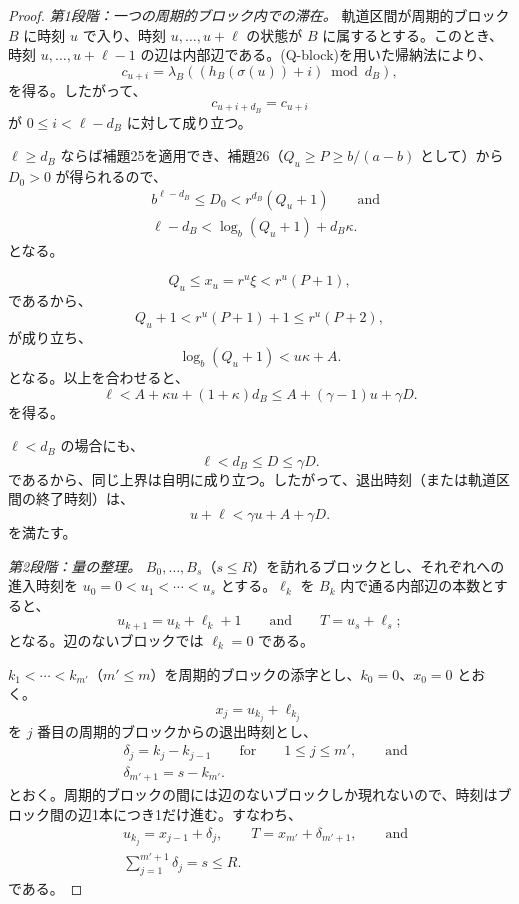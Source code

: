 \documentclass[11pt,reqno]{amsart}
\theoremstyle{definition}
\theoremstyle{definition}
\theoremstyle{remark}
\begin{document}
\begin{proof}\leavevmode\label{proof:27}
\emph{第1段階：一つの周期的ブロック内での滞在。} 軌道区間が周期的ブロック \(B\) に時刻 \(u\) で入り、時刻 \(u,\ldots,u+\ell\) の状態が \(B\) に属するとする。このとき、時刻 \(u,\ldots,u+\ell-1\) の辺は内部辺である。(Q-block)を用いた帰納法により、
\[
c_{u+i}=\lambda_B((h_B(\sigma(u))+i)\bmod d_B),
\]
を得る。したがって、
\[
c_{u+i+d_B}=c_{u+i}
\]
が \(0\le i<\ell-d_B\) に対して成り立つ。

\(\ell\ge d_B\) ならば補題25を適用でき、補題26（\(Q_u\ge P\ge b/(a-b)\) として）から \(D_0>0\) が得られるので、
\[
\begin{aligned}
&b^{\ell-d_B}\le D_0<r^{d_B}(Q_u+1)\qquad\text{and}\\
&\ell-d_B<\log_b(Q_u+1)+d_B\kappa.
\end{aligned}
\]
となる。

\[
Q_u\le x_u=r^u\xi<r^u(P+1),
\]
であるから、
\[
Q_u+1<r^u(P+1)+1\le r^u(P+2),
\]
が成り立ち、
\[
\log_b(Q_u+1)<u\kappa+A.
\]
となる。以上を合わせると、
\[
\ell<A+\kappa u+(1+\kappa)d_B\le A+(\gamma-1)u+\gamma D.
\]
を得る。

\(\ell<d_B\) の場合にも、
\[
\ell<d_B\le D\le\gamma D.
\]
であるから、同じ上界は自明に成り立つ。したがって、退出時刻（または軌道区間の終了時刻）は、
\[
u+\ell<\gamma u+A+\gamma D.
\]
を満たす。

\emph{第2段階：量の整理。} \(B_0,\ldots,B_s\)（\(s\le R\)）を訪れるブロックとし、それぞれへの進入時刻を \(u_0=0<u_1<\cdots<u_s\) とする。\(\ell_k\) を \(B_k\) 内で通る内部辺の本数とすると、
\[
u_{k+1}=u_k+\ell_k+1\qquad \text{and}\qquad T=u_s+\ell_s;
\]
となる。辺のないブロックでは \(\ell_k=0\) である。

\(k_1<\cdots<k_{m'}\)（\(m'\le m\)）を周期的ブロックの添字とし、\(k_0=0\)、\(x_0=0\) とおく。
\[
x_j=u_{k_j}+\ell_{k_j}
\]
を \(j\) 番目の周期的ブロックからの退出時刻とし、
\[
\begin{aligned}
&\delta_j=k_j-k_{j-1}\qquad \text{for}\qquad 1\le j\le m',\qquad\text{and}\\
&\delta_{m'+1}=s-k_{m'}.
\end{aligned}
\]
とおく。周期的ブロックの間には辺のないブロックしか現れないので、時刻はブロック間の辺1本につき1だけ進む。すなわち、
\[
\begin{aligned}
&u_{k_j}=x_{j-1}+\delta_j,\qquad T=x_{m'}+\delta_{m'+1},\qquad\text{and}\\
&\sum_{j=1}^{m'+1}\delta_j=s\le R.
\end{aligned}
\]
である。


\end{proof}
\end{document}

